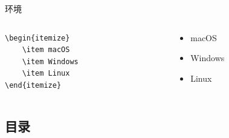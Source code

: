 \begin{frame}[fragile]{环境}
\vspace{1em}
\pause
\begin{columns}
    \begin{column}{0.4\textwidth}
        \begin{verbatim}
\begin{itemize}
    \item macOS
    \item Windows
    \item Linux
\end{itemize}
        \end{verbatim}
    \end{column}
    \begin{column}{0.4\textwidth}
        \small
\begin{itemize}
    \item macOS
    \item Windows
    \item Linux
\end{itemize}
    \end{column}
\end{columns}
\end{frame}

\subsection{目录}

